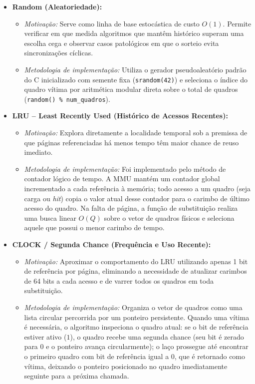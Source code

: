 \documentclass[12pt,a4paper]{article}
\begin{document}
\begin{itemize}
    \item \textbf{Random (Aleatoriedade):}
    \begin{itemize}
        \item \textit{Motivação:} Serve como linha de base estocástica de custo $O(1)$. Permite verificar em que medida algoritmos que mantêm histórico superam uma escolha cega e observar casos patológicos em que o sorteio evita sincronizações cíclicas.
        \item \textit{Metodologia de implementação:} Utiliza o gerador pseudoaleatório padrão do C inicializado com semente fixa (\texttt{srandom(42)}) e seleciona o índice do quadro vítima por aritmética modular direta sobre o total de quadros (\texttt{random() \% num\_quadros}).
    \end{itemize}

    \item \textbf{LRU -- Least Recently Used (Histórico de Acessos Recentes):}
    \begin{itemize}
        \item \textit{Motivação:} Explora diretamente a localidade temporal sob a premissa de que páginas referenciadas há menos tempo têm maior chance de reuso imediato.
        \item \textit{Metodologia de implementação:} Foi implementado pelo método de contador lógico de tempo. A MMU mantém um contador global incrementado a cada referência à memória; todo acesso a um quadro (seja carga ou \textit{hit}) copia o valor atual desse contador para o carimbo de último acesso do quadro. Na falta de página, a função de substituição realiza uma busca linear $O(Q)$ sobre o vetor de quadros físicos e seleciona aquele que possui o menor carimbo de tempo.
    \end{itemize}

    \item \textbf{CLOCK / Segunda Chance (Frequência e Uso Recente):}
    \begin{itemize}
        \item \textit{Motivação:} Aproximar o comportamento do LRU utilizando apenas 1 bit de referência por página, eliminando a necessidade de atualizar carimbos de 64 bits a cada acesso e de varrer todos os quadros em toda substituição.
        \item \textit{Metodologia de implementação:} Organiza o vetor de quadros como uma lista circular percorrida por um ponteiro persistente. Quando uma vítima é necessária, o algoritmo inspeciona o quadro atual: se o bit de referência estiver ativo ($1$), o quadro recebe uma segunda chance (seu bit é zerado para $0$ e o ponteiro avança circularmente); o laço prossegue até encontrar o primeiro quadro com bit de referência igual a $0$, que é retornado como vítima, deixando o ponteiro posicionado no quadro imediatamente seguinte para a próxima chamada.
    \end{itemize}


\end{itemize}
\end{document}
